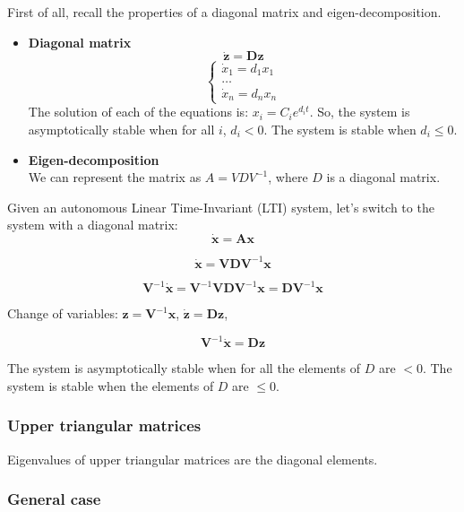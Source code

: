 First of all, recall the properties of a diagonal matrix and eigen-decomposition.
\begin{itemize}
    \item \textbf{Diagonal matrix}
        \[\mathbf{\dot{z}} = \mathbf{D}  \mathbf{z}\]
        \[
        \begin{cases}
            \dot{x}_1 = d_1 x_1 \\
            \dots \\
            \dot{x}_n = d_n x_n
        \end{cases}
        \]
        The solution of each of the equations is: \(x_i = C_i e^{d_i t}\).
        So, the system is asymptotically stable when for all \(i\), \(d_i < 0\). 
        The system is stable when \(d_i \leq 0\).
    \item \textbf{Eigen-decomposition}\\
        We can represent the matrix as \(A = VDV^{-1}\), where \(D\) is a diagonal matrix.
\end{itemize}

Given an autonomous Linear Time-Invariant (LTI) system, let's switch to the system with a diagonal matrix:
\[
\mathbf{\dot{x}} = \mathbf{A} \mathbf{x}
\]

\[
\mathbf{\dot{x}} = \mathbf{V} \mathbf{D} \mathbf{V}^{-1} \mathbf{x}
\]

\[
\mathbf{V}^{-1} \mathbf{\dot{x}} = \mathbf{V}^{-1} \mathbf{V} \mathbf{D} \mathbf{V}^{-1} \mathbf{x} = \mathbf{D} \mathbf{V}^{-1} \mathbf{x}
\]

Change of variables: \(\mathbf{z} = \mathbf{V}^{-1} \mathbf{x}\), \(\mathbf{\dot{z}} = \mathbf{D} \mathbf{z}\),

\[
\mathbf{V}^{-1} \mathbf{\dot{x}} = \mathbf{D} \mathbf{z}
\]


The system is asymptotically stable when for all the elements of \(D\) are \( < 0\). 
The system is stable when the elements of \(D\) are \(\leq 0\).  

\subsubsection{Upper triangular matrices}

\begin{tcolorbox}[colback=white]
    Eigenvalues of upper triangular matrices are the diagonal elements.
\end{tcolorbox}
    

\subsubsection{General case}

